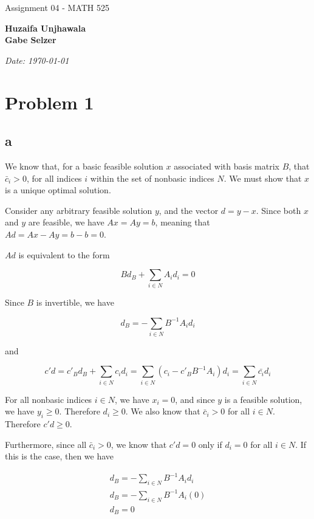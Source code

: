 \documentclass[11pt,a4paper]{article}
\begin{document}
\begin{titlepage}
    \centering
    \vspace*{0.5cm}
    \par\normalfont\fontsize{35}{35}\sffamily\selectfont
    Assignment 04 - MATH 525\par 
    \vspace*{1cm}
    {\huge\bfseries Huzaifa Unjhawala \\  Gabe Selzer \par} 
    \vspace*{1cm}
    {\Large\itshape Date: \today\par} 
    \vfill
\end{titlepage}

\section*{Problem 1}
\subsection*{a}
We know that, for a basic feasible solution $x$ associated with basis matrix $B$, that $\bar{c}_i>0$, for all indices $i$ within the set of nonbasic indices $N$. We must show that $x$ is a unique optimal solution.

Consider any arbitrary feasible solution $y$, and the vector $d=y-x$. Since both $x$ and $y$ are feasible, we have $Ax=Ay=b$, meaning that $Ad=Ax-Ay=b-b=0$.

$Ad$ is equivalent to the form

$$
Bd_B + \sum_{i\in N} A_id_i=0
$$

Since $B$ is invertible, we have 

$$
d_B = -\sum_{i\in N}B^{-1}A_id_i
$$

and

$$
c'd=c'_Bd_B + \sum_{i\in N}c_id_i=\sum_{i\in N}(c_i-c'_BB^{-1}A_i)d_i=\sum_{i\in N}\bar{c_i}d_i
$$

For all nonbasic indices $i\in N$, we have $x_i=0$, and since $y$ is a feasible solution, we have $y_i\geq 0$. Therefore $d_i\geq 0$. We also know that $\bar{c}_i>0$ for all $i\in N$. Therefore $c'd\geq 0$. 

Furthermore, since all $\bar{c}_i>0$, we know that $c'd=0$ only if $d_i=0$ for all $i\in N$. If this is the case, then we have 

\begin{equation}
\begin{split}
d_B=-\sum_{i\in N} B^{-1}A_id_i \\
d_B=-\sum_{i\in N} B^{-1}A_i(0) \\
d_B=0
\end{split}
\end{equation}
\end{document}
